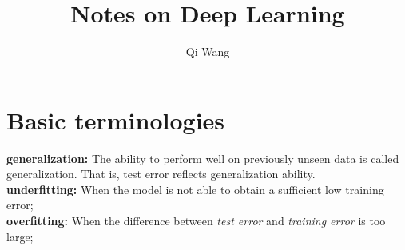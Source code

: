 \documentclass{article}
\author{Qi Wang}
\title{Notes on Deep Learning}
\begin{document}
\maketitle
\section*{Basic terminologies}
\textbf{generalization:} The ability to perform well on previously unseen data is called generalization. That is, test error reflects generalization ability.\\
\textbf{underfitting:} When the model is not able to obtain a sufficient low training error;\\
\textbf{overfitting:} When the difference between \textit{test error} and \textit{training error} is too large;\\
\end{document}
